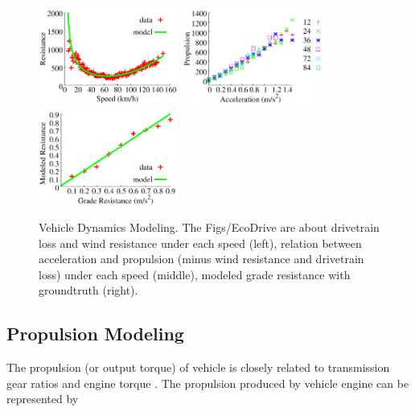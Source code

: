 \begin{figure}[t]
\begin{center}
\includegraphics[width=1.8in,angle=0]{Figs/EcoDrive/lei_loss.pdf}
\hspace{-0.0cm}
\includegraphics[width=1.8in,angle=0]{Figs/EcoDrive/lei_torque.pdf}
\hspace{-0.0cm}
\includegraphics[width=1.8in,angle=0]{Figs/EcoDrive/lei_slope.pdf}
\hspace{-0.0cm}
\vspace{-0.2cm}
\caption{Vehicle Dynamics Modeling. The Figs/EcoDrive are about drivetrain loss and wind resistance under each speed (left), 
relation between acceleration and propulsion (minus wind resistance and drivetrain loss) under each speed (middle), 
modeled grade resistance with groundtruth (right).}
\vspace{-0.8cm}
\label{modeling}
\end{center}
\end{figure}

\subsection{Propulsion Modeling}


The propulsion (or output torque) of vehicle is closely related
to transmission gear ratios and engine torque \cite{vong2006prediction, giannelli2005heavy}. 
The propulsion produced by vehicle engine
can be represented by

